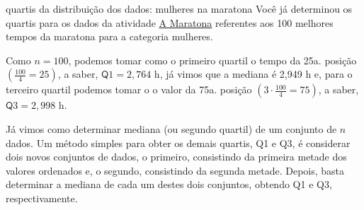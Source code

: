 \begin{example}{quartis da distribuição dos dados: mulheres na maratona}
Você já determinou os quartis para os dados da atividade \hyperref[\detokenize{PE104-0:ativ-maratona-de-ny}]{A Maratona} referentes aos 100 melhores tempos da maratona para a categoria mulheres.

Como \(n=100\), podemos tomar como o primeiro quartil o tempo da 25a. posição \(\left (\frac{100}{4}=25\right )\), a saber, \(\textsf{Q}1=2,764\) h, já vimos que a mediana é 2,949 h e, para o terceiro quartil podemos tomar o  o valor da 75a. posição \(\left (3\cdot\frac{100}{4}=75\right )\), a saber, \(\textsf{Q}3=2,998\) h.
\end{example}

Já vimos como determinar mediana (ou segundo quartil) de um conjunto de \(n\) dados. Um método simples para obter os demais quartis, Q1 e Q3, é considerar dois novos conjuntos de dados, o primeiro, consistindo da primeira metade dos valores ordenados e, o segundo, consistindo da segunda metade. Depois, basta determinar a mediana de cada um destes dois conjuntos, obtendo Q1 e Q3, respectivamente.


